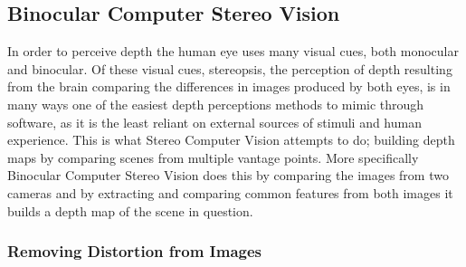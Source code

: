 \subsection{Binocular Computer Stereo Vision}
In order to perceive depth the human eye uses many visual cues, both monocular and binocular. Of these visual cues, stereopsis, the perception of depth resulting from the brain comparing the differences in images produced by both eyes, is in many ways one of the easiest depth perceptions methods to mimic through software, as it is the least reliant on external sources of stimuli and human experience. This is what Stereo Computer Vision attempts to do; building depth maps by comparing scenes from multiple vantage points. More specifically Binocular Computer Stereo Vision does this by comparing the images from two cameras and by extracting and comparing common features from both images it builds a depth map of the scene in question.

\subsubsection{Removing Distortion from Images}
